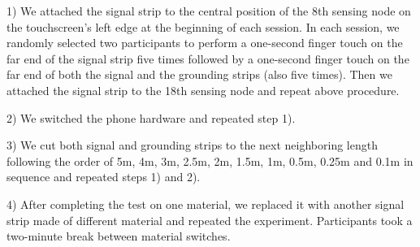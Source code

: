 1) We attached the signal strip to the central position of the 8th sensing node on the touchscreen's left edge at the beginning of each session. In each session, we randomly selected two participants to perform a one-second finger touch on the far end of the signal strip five times followed by a one-second finger touch on the far end of both the signal and the grounding strips (also five times). Then we attached the signal strip to the 18th sensing node and repeat above procedure. 

2) We switched the phone hardware and repeated step 1).

3) We cut both signal and grounding strips to the next neighboring length following the order of 5m, 4m, 3m, 2.5m, 2m, 1.5m, 1m, 0.5m, 0.25m and 0.1m in sequence and repeated steps 1) and 2).

4) After completing the test on one material, we replaced it with another signal strip made of different material and repeated the experiment. Participants took a two-minute break between material switches.


